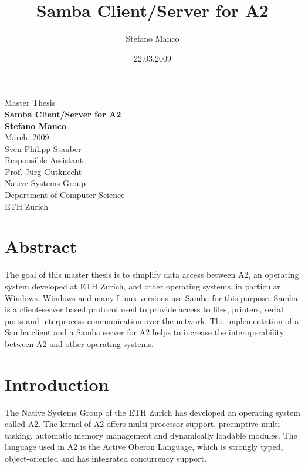 \documentclass[11pt,a4paper]{book}
\author{Stefano Manco}
\title{Samba Client/Server for A2}
\date{22.03.2009}
\begin{document}
\frontmatter
\begin{titlepage}
\begin{center}
{\large Master Thesis} \\
{\huge\bf Samba Client/Server for A2} \\
{\Large\bf Stefano Manco} \\
March, 2009 \\
Sven Philipp Stauber \\
{\footnotesize Responsible Assistant} \\
Prof. J\"{u}rg Gutknecht \\
Native Systems Group \\
Department of Computer Science \\
ETH Zurich \\
\end{center}
\end{titlepage}

\chapter*{Abstract}
The goal of this master thesis is to simplify data access between A2, an operating system developed at ETH Zurich, and other operating systems, in particular Windows. Windows and many Linux versions use Samba for this purpose. Samba is a client-server based protocol used to provide access to files, printers, serial ports and interprocess communication over the network. The implementation of a Samba client and a Samba server for A2 helps to increase the interoperability between A2 and other operating systems. 

\tableofcontents

\mainmatter

\chapter{Introduction}
The Native Systems Group of the ETH Zurich has developed an operating system called A2. The kernel of A2 offers multi-processor support, preemptive multi-tasking, automatic memory management and dynamically loadable modules. The language used in A2 is the Active Oberon Language, which is strongly typed, object-oriented and has integrated concurrency support.
\end{document}

